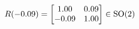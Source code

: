 \documentclass[preview]{standalone}
\begin{document}
\begin{align*}
\special{dvisvgm:raw <g id='unique000'>}R(-0.09) = \begin{bmatrix} 1.00 & 0.09 \\ -0.09 & 1.00 \end{bmatrix} \in \text{SO}(2)\special{dvisvgm:raw </g>}
\end{align*}
\end{document}
